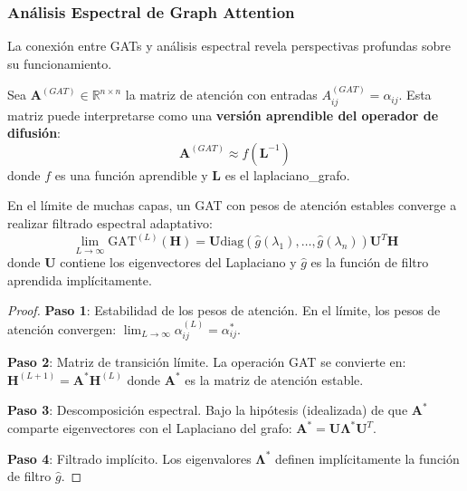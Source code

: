 \subsubsection{Análisis Espectral de Graph Attention}\label{subsubsec:analisis_espectral_gat}

La conexión entre GATs y análisis espectral revela perspectivas profundas sobre su funcionamiento.

\begin{definition}\label{def:spectral_interpretation_attention}
Sea $\mathbf{A}^{(GAT)} \in \mathbb{R}^{n \times n}$ la matriz de atención con entradas $A^{(GAT)}_{ij} = \alpha_{ij}$. Esta matriz puede interpretarse como una \textbf{versión aprendible del operador de difusión}:
\begin{equation}
    \mathbf{A}^{(GAT)} \approx f(\mathbf{L}^{-1})
    \label{eq:gat_spectral_approximation}
\end{equation}
donde $f$ es una función aprendible y $\mathbf{L}$ es el \gls{laplaciano_grafo}.
\end{definition}

\begin{theorem}\label{thm:gat_spectral_connection}
En el límite de muchas capas, un \gls{GAT} con pesos de atención estables converge a realizar filtrado espectral adaptativo:
\begin{equation}
    \lim_{L \to \infty} \text{GAT}^{(L)}(\mathbf{H}) = \mathbf{U} \text{diag}(\hat{g}(\lambda_1), \ldots, \hat{g}(\lambda_n)) \mathbf{U}^T \mathbf{H}
    \label{eq:gat_spectral_limit}
\end{equation}
donde $\mathbf{U}$ contiene los eigenvectores del Laplaciano y $\hat{g}$ es la función de filtro aprendida implícitamente.
\end{theorem}

\begin{proof}
\textbf{Paso 1}: Estabilidad de los pesos de atención.
En el límite, los pesos de atención convergen: $\lim_{L \to \infty} \alpha_{ij}^{(L)} = \alpha_{ij}^*$.

\textbf{Paso 2}: Matriz de transición límite.
La operación \gls{GAT} se convierte en: $\mathbf{H}^{(L+1)} = \mathbf{A}^* \mathbf{H}^{(L)}$ donde $\mathbf{A}^*$ es la matriz de atención estable.

\textbf{Paso 3}: Descomposición espectral.
Bajo la hipótesis (idealizada) de que $\mathbf{A}^*$ comparte eigenvectores con el Laplaciano del grafo: $\mathbf{A}^* = \mathbf{U} \mathbf{\Lambda}^* \mathbf{U}^T$.

\textbf{Paso 4}: Filtrado implícito.
Los eigenvalores $\mathbf{\Lambda}^*$ definen implícitamente la función de filtro $\hat{g}$.
\end{proof}

